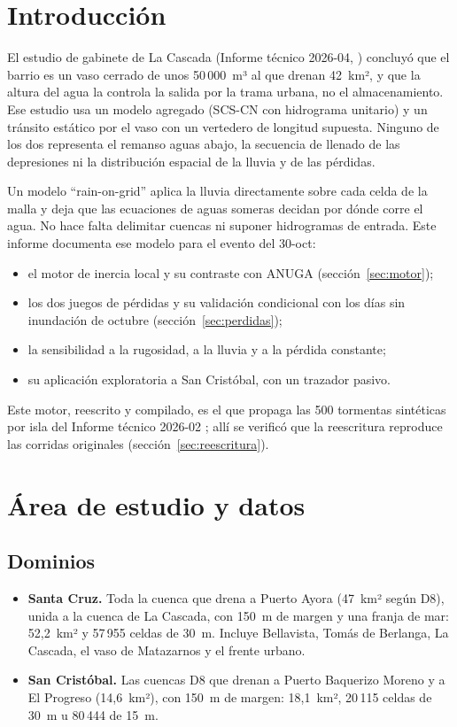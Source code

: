 \documentclass{sosg-informe}
\begin{document}
\section{Introducción}

El estudio de gabinete de La Cascada (Informe técnico 2026-04, \citealp{sosg202604}) concluyó que el barrio es un vaso cerrado de unos 50\,000~m³ al que drenan 42~km², y que la altura del agua la controla la salida por la trama urbana, no el almacenamiento. Ese estudio usa un modelo agregado (SCS-CN con hidrograma unitario) y un tránsito estático por el vaso con un vertedero de longitud supuesta. Ninguno de los dos representa el remanso aguas abajo, la secuencia de llenado de las depresiones ni la distribución espacial de la lluvia y de las pérdidas.

Un modelo \enquote{rain-on-grid} aplica la lluvia directamente sobre cada celda de la malla y deja que las ecuaciones de aguas someras decidan por dónde corre el agua. No hace falta delimitar cuencas ni suponer hidrogramas de entrada. Este informe documenta ese modelo para el evento del 30-oct:
\begin{itemize}
  \item el motor de inercia local y su contraste con ANUGA (sección~\ref{sec:motor});
  \item los dos juegos de pérdidas y su validación condicional con los días sin inundación de octubre (sección~\ref{sec:perdidas});
  \item la sensibilidad a la rugosidad, a la lluvia y a la pérdida constante;
  \item su aplicación exploratoria a San Cristóbal, con un trazador pasivo.
\end{itemize}
Este motor, reescrito y compilado, es el que propaga las 500 tormentas sintéticas por isla del Informe técnico 2026-02 \citep{sosg202602}; allí se verificó que la reescritura reproduce las corridas originales (sección~\ref{sec:reescritura}).

\section{Área de estudio y datos}

\subsection{Dominios}
\begin{itemize}
  \item \textbf{Santa Cruz.} Toda la cuenca que drena a Puerto Ayora (47~km² según D8), unida a la cuenca de La Cascada, con 150~m de margen y una franja de mar: 52,2~km² y 57\,955 celdas de 30~m. Incluye Bellavista, Tomás de Berlanga, La Cascada, el vaso de Matazarnos y el frente urbano.
  \item \textbf{San Cristóbal.} Las cuencas D8 que drenan a Puerto Baquerizo Moreno y a El Progreso (14,6~km²), con 150~m de margen: 18,1~km², 20\,115 celdas de 30~m u 80\,444 de 15~m.
\end{itemize}
\end{document}
